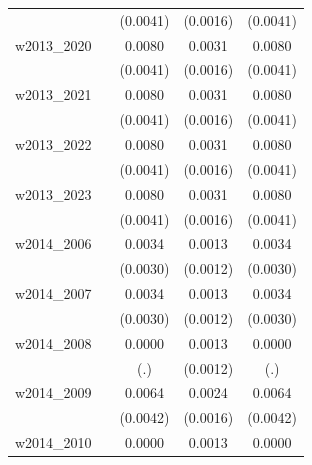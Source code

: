 \begin{table}[htbp]
\begin{tabular}{l*{4}{c}}
            &                     &    (0.0041)         &    (0.0016)         &    (0.0041)         \\
[1em]
w2013\_2020  &                     &      0.0080\sym{**} &      0.0031\sym{**} &      0.0080\sym{**} \\
            &                     &    (0.0041)         &    (0.0016)         &    (0.0041)         \\
[1em]
w2013\_2021  &                     &      0.0080\sym{**} &      0.0031\sym{**} &      0.0080\sym{**} \\
            &                     &    (0.0041)         &    (0.0016)         &    (0.0041)         \\
[1em]
w2013\_2022  &                     &      0.0080\sym{**} &      0.0031\sym{**} &      0.0080\sym{**} \\
            &                     &    (0.0041)         &    (0.0016)         &    (0.0041)         \\
[1em]
w2013\_2023  &                     &      0.0080\sym{**} &      0.0031\sym{**} &      0.0080\sym{**} \\
            &                     &    (0.0041)         &    (0.0016)         &    (0.0041)         \\
[1em]
w2014\_2006  &                     &      0.0034         &      0.0013         &      0.0034         \\
            &                     &    (0.0030)         &    (0.0012)         &    (0.0030)         \\
[1em]
w2014\_2007  &                     &      0.0034         &      0.0013         &      0.0034         \\
            &                     &    (0.0030)         &    (0.0012)         &    (0.0030)         \\
[1em]
w2014\_2008  &                     &      0.0000         &      0.0013         &      0.0000         \\
            &                     &         (.)         &    (0.0012)         &         (.)         \\
[1em]
w2014\_2009  &                     &      0.0064         &      0.0024         &      0.0064         \\
            &                     &    (0.0042)         &    (0.0016)         &    (0.0042)         \\
[1em]
w2014\_2010  &                     &      0.0000         &      0.0013         &      0.0000         \\

\end{tabular}
\end{table}

